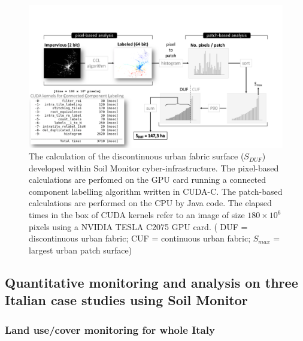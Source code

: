 \documentclass[APA,LATO1COL,doublespace]{WileyNJD-v2}
\begin{document}
\begin{figure}[t] %
    \centerline{\includegraphics[width=500pt]{03_DUF_explanation.pdf}}
    \caption{ The calculation of the discontinuous urban fabric surface ($S_{DUF}$) developed within Soil Monitor cyber-infrastructure. 
    The pixel-based calculations are perfomed on the GPU card running a connected component labelling algorithm written in CUDA-C. 
    The patch-based calculations are performed on the CPU by Java code.
    The elapsed times in the box of CUDA kernels refer to an image of size $180 \times 10^6$ pixels using a NVIDIA TESLA C2075 GPU card.
    ( DUF = discontinuous urban fabric; CUF = continuous urban fabric; $S_{max}$ = largest urban patch surface)} \label{fig:ccl}
\end{figure}

\subsection{Quantitative monitoring and analysis on three Italian case studies using Soil Monitor}\label{sec:caseStudies}

\subsubsection{ Land use/cover monitoring for whole Italy } \label{sec:caseIT}
\end{document}
